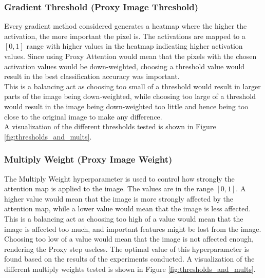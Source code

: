 \subsubsection{Gradient Threshold (Proxy Image Threshold)}
Every gradient method considered generates a heatmap where the higher the activation, the more important the pixel is. The activations are mapped to a $[0,1]$ range with higher values in the heatmap indicating higher activation values. Since using Proxy Attention would mean that the pixels with the chosen activation values would be down-weighted, choosing a threshold value would result in the best classification accuracy was important.\\
This is a balancing act as choosing too small of a threshold would result in larger parts of the image being down-weighted, while choosing too large of a threshold would result in the image being down-weighted too little and hence being too close to the original image to make any difference.\\
A visualization of the different thresholds tested is shown in Figure \ref{fig:thresholds_and_mults}.


\subsubsection{Multiply Weight (Proxy Image Weight)}
The Multiply Weight hyperparameter is used to control how strongly the attention map is applied to the image. The values are in the range $[0,1]$. A higher value would mean that the image is more strongly affected by the attention map, while a lower value would mean that the image is less affected. This is a balancing act as choosing too high of a value would mean that the image is affected too much, and important features might be lost from the image. Choosing too low of a value would mean that the image is not affected enough, rendering the Proxy step useless. The optimal value of this hyperparameter is found based on the results of the experiments conducted. A visualization of the different multiply weights tested is shown in Figure \ref{fig:thresholds_and_mults}.

